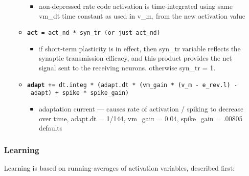 \begin{itemize}
\begin{itemize}
    \begin{itemize}
    \tightlist
    \item
      non-depressed rate code activation is time-integrated using same
      vm\_dt time constant as used in v\_m, from the new activation
      value
    \end{itemize}
  \item
    \textbf{\texttt{act}}\texttt{\ =\ act\_nd\ *\ syn\_tr\ (or\ just\ act\_nd)}

    \begin{itemize}
    \tightlist
    \item
      if short-term plasticity is in effect, then syn\_tr variable
      reflects the synaptic transmission efficacy, and this product
      provides the net signal sent to the receiving neurons. otherwise
      syn\_tr = 1.
    \end{itemize}
  \item
    \textbf{\texttt{adapt}}\texttt{\ +=\ dt.integ\ *\ (adapt.dt\ *\ (vm\_gain\ *\ (v\_m\ -\ e\_rev.l)\ -\ adapt)\ +\ spike\ *\ spike\_gain)}

    \begin{itemize}
    \tightlist
    \item
      adaptation current --- causes rate of activation / spiking to
      decrease over time, adapt.dt = 1/144, vm\_gain = 0.04, spike\_gain
      = .00805 defaults
    \end{itemize}
  \end{itemize}
\end{itemize}

\subsubsection{Learning}\label{learning}

Learning is based on running-averages of activation variables, described
first:

